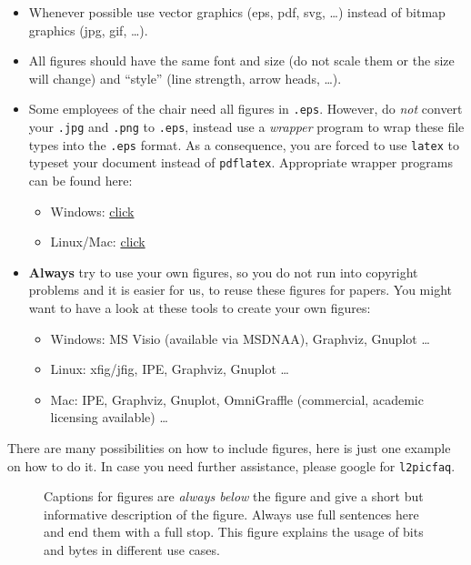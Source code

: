 \begin{itemize}
\item Whenever possible use vector graphics (eps, pdf, svg, \ldots) instead of bitmap graphics (jpg, gif, \ldots).
\item All figures should have the same font and size (do not scale them or the size will change) and ``style'' (line strength, arrow heads, \ldots).
\item Some employees of the chair need all figures in \texttt{.eps}. However, do \emph{not} convert your \texttt{.jpg} and \texttt{.png} to \texttt{.eps}, instead use a \emph{wrapper} program to wrap these file types into the \texttt{.eps} format. As a consequence, you are forced to use \texttt{latex} to typeset your document instead of \texttt{pdflatex}. Appropriate wrapper programs can be found here:
\begin{itemize}
\item Windows: \href{https://wiki.crypto.rub.de/WikiCosy/img_auth.php/6/60/JPG-PNGtoEPS.rar}{click}
\item Linux/Mac: \href{http://imgtops.sourceforge.net/}{click}
\end{itemize}
\item \textbf{Always} try to use your own figures, so you do not run into copyright problems and it is easier for us, to reuse these figures for papers. You might want to have a look at these tools to create your own figures:
	\begin{itemize}
	\item Windows: MS Visio (available via MSDNAA), Graphviz, Gnuplot \dots
	\item Linux: xfig/jfig, IPE, Graphviz, Gnuplot \dots
	\item Mac: IPE, Graphviz, Gnuplot, OmniGraffle (commercial, academic licensing available) \dots
	\end{itemize}
\end{itemize}

There are many possibilities on how to include figures, here is just one example on how to do it. In case you need further assistance, please google for \texttt{l2picfaq}.



\ifpdf
\newpage

\thispagestyle{empty}
\vspace*{2cm}
\begin{figure}[htbp]
	\centering
	\caption{Captions for figures are \emph{always below} the figure and give a short but informative description of the figure. Always use full sentences here and end them with a full stop. This figure explains the usage of bits and bytes in different use cases.}	
	\label{fig:emseclogo}
\end{figure}

